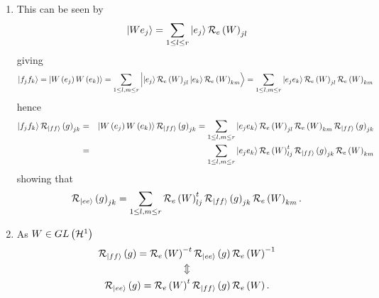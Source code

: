 \begin{enumerate}
\begin{enumerate}
\item This can be seen by 
\begin{equation}
\left\vert We_{j}\right\rangle =\sum_{1\leq l\leq r}\left\vert
e_{j}\right\rangle {\cal R}_{e}\left( W\right) _{jl}
\end{equation}%
giving 
\begin{equation}
\left\vert f_{j}f_{k}\right\rangle =\left\vert W\left( e_{j}\right) W\left(
e_{k}\right) \right\rangle =\sum_{1\leq l,m\leq r}\left\vert \left\vert
e_{j}\right\rangle {\cal R}_{e}\left( W\right) _{jl}\left\vert
e_{k}\right\rangle {\cal R}_{e}\left( W\right) _{km}\right\rangle
=\sum_{1\leq l,m\leq r}\left\vert e_{j}e_{k}\right\rangle {\cal R}_{e}\left(
W\right) _{jl}{\cal R}_{e}\left( W\right) _{km}
\end{equation}%
hence 
\begin{eqnarray}
\left\vert f_{j}f_{k}\right\rangle {\cal R}_{\left\vert ff\right\rangle
}\left( g\right) _{jk} &=&\left\vert W\left( e_{j}\right) W\left(
e_{k}\right) \right\rangle {\cal R}_{\left\vert ff\right\rangle }\left(
g\right) _{jk}=\sum_{1\leq l,m\leq r}\left\vert e_{j}e_{k}\right\rangle 
{\cal R}_{e}\left( W\right) _{jl}{\cal R}_{e}\left( W\right) _{km}{\cal R}%
_{\left\vert ff\right\rangle }\left( g\right) _{jk} \\
&=&\sum_{1\leq l,m\leq r}\left\vert e_{j}e_{k}\right\rangle {\cal R}%
_{e}\left( W\right) _{lj}^{t}{\cal R}_{\left\vert ff\right\rangle }\left(
g\right) _{jk}{\cal R}_{e}\left( W\right) _{km}
\end{eqnarray}%
showing that 
\begin{equation}
{\cal R}_{\left\vert ee\right\rangle }\left( g\right) _{jk}=\sum_{1\leq
l,m\leq r}{\cal R}_{e}\left( W\right) _{lj}^{t}{\cal R}_{\left\vert
ff\right\rangle }\left( g\right) _{jk}{\cal R}_{e}\left( W\right) _{km}.
\end{equation}

\item As $W\in GL\left( {\cal H}^{1}\right) $ 
\begin{gather}
{\cal R}_{\left\vert ff\right\rangle }\left( g\right) ={\cal R}_{e}\left(
W\right) ^{-t}{\cal R}_{\left\vert ee\right\rangle }\left( g\right) {\cal R}%
_{e}\left( W\right) ^{-1} \\
\Updownarrow \\
{\cal R}_{\left\vert ee\right\rangle }\left( g\right) ={\cal R}_{e}\left(
W\right) ^{t}{\cal R}_{\left\vert ff\right\rangle }\left( g\right) {\cal R}%
_{e}\left( W\right) .
\end{gather}


\end{enumerate}
\end{enumerate}
